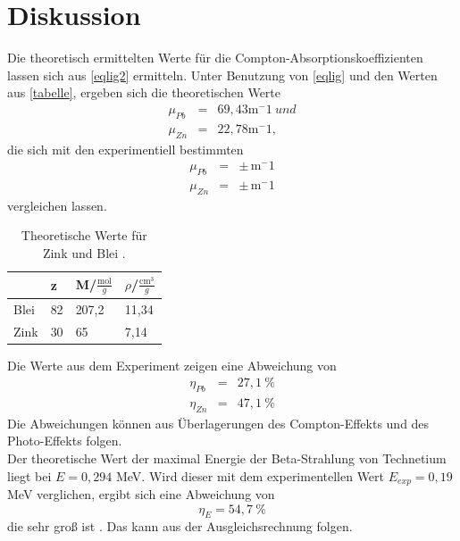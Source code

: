 \section{Diskussion}
\label{sec:Diskussion}


Die theoretisch ermittelten Werte für die Compton-Absorptionskoeffizienten lassen sich aus \eqref{eqlig2} ermitteln. Unter Benutzung von \eqref{eqlig} und den Werten aus \autoref{tabelle}, ergeben sich die theoretischen Werte
\begin{eqnarray}
  \mu_{Pb} &=& 69,43  \mathrm{m^-1}\ und \nonumber \\
  \mu_{Zn} &=& 22,78  \mathrm{m^-1}, \nonumber 
\end{eqnarray}
die sich mit den experimentiell bestimmten 
\begin{eqnarray}
  \mu_{Pb} &=&   \pm  \,  \mathrm{m^-1} \nonumber \\
  \mu_{Zn} &=&   \pm  \,  \mathrm{m^-1} \nonumber 
\end{eqnarray}
vergleichen lassen.
\begin{table}[H]
 \centering
 \caption{Theoretische Werte für Zink und Blei \cite{2} \cite{3}.}
 \begin{tabular}{l|l|l|l}
 & z & M/$\frac{\textrm{mol}}{g}$ & $\rho$/$\frac{\textrm{cm}^3}{g}$\\\hline
 Blei & 82 & 207,2 & 11,34\\
 Zink & 30 & 65 & 7,14\\\hline
 \end{tabular}
 \label{tabelle}
\end{table}
Die Werte aus dem Experiment zeigen eine Abweichung von
\begin{eqnarray}
  \eta_{Pb} &=& 27,1 \ \% \nonumber \\
  \eta_{Zn} &=& 47,1 \ \% \nonumber 
\end{eqnarray}
Die Abweichungen können aus Überlagerungen des Compton-Effekts und des Photo-Effekts folgen.\\
Der theoretische Wert der maximal Energie der Beta-Strahlung von Technetium liegt bei $E=0,294$ MeV. Wird dieser mit dem experimentellen Wert $E_{exp}=0,19$ MeV verglichen, ergibt sich eine Abweichung von 
\begin{equation*}
  \eta_{E}=54,7 \ \%
\end{equation*}
die sehr groß ist \cite{4}. Das kann aus der Ausgleichsrechnung folgen. 

